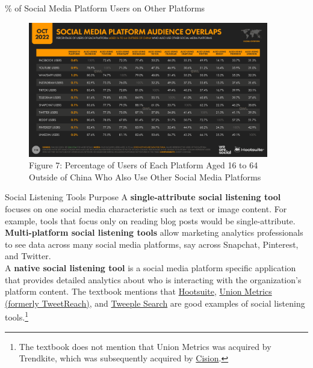 \documentclass[pdf]{beamer}
\newcommand{\empr}[1]{{\color{franklinblue}\textbf{#1}}}
\theoremstyle{remark}
\theoremstyle{definition}
\begin{document}
\begin{frame}[t]{\% of Social Media Platform Users on Other Platforms}
\begin{figure}[htbp]
  \captionsetup{justification=centering}
  \includegraphics[height=5.9cm, trim=0.0cm 0.0cm 0.0cm 0.0cm width=5.9cm]{Images/Hootsuite_SocialMedia_1022_3.png}
  \caption{Figure {\color{franklinblue} 7}: Percentage of Users of Each Platform Aged 16 to 64 \\ Outside of China Who Also Use Other Social Media Platforms}
\end{figure}
\end{frame}

\begin{frame}[t]{Social Listening Tools Purpose}
A \empr{single-attribute social listening tool} focuses on one social media characteristic such as text or image content. For example, tools that focus only on reading blog posts would be single-attribute. \\
\vspace{1.5ex}
\empr{Multi-platform social listening tools} allow marketing analytics professionals to see data across many social media platforms, say across Snapchat, Pinterest, and Twitter. \\
\vspace{1.5ex}
A \empr{native social listening tool} is a social media platform specific application that provides detailed analytics about who is interacting with the organization's platform content. The textbook mentions that \href{https://www.hootsuite.com/}{Hootsuite}, \href{https://partners.twitter.com/en/partners/union-metrics}{Union Metrics (formerly TweetReach)}, and \href{https://tweeplesearch.com}{Tweeple Search} are good examples of social listening tools.\footnote{The textbook does not mention that Union Metrics was acquired by Trendkite, which was subsequently acquired by \href{https://www.cision.com/}{Cision}.}
\end{frame}
\end{document}
